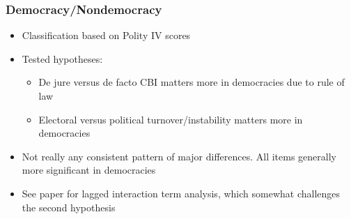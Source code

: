 \documentclass{beamer}
\begin{document}
    \begin{frame}
        \frametitle{Democracy/Nondemocracy}
        \begin{itemize}
            \item Classification based on Polity IV scores
            \item Tested hypotheses:
            \begin{itemize}
                \item De jure versus de facto CBI matters more in democracies due to rule of law
                \item Electoral versus political turnover/instability matters more in democracies
            \end{itemize}
            \item Not really any consistent pattern of major differences. All items generally more significant in democracies
            \item See paper for lagged interaction term analysis, which somewhat challenges the second hypothesis
        \end{itemize}
    \end{frame}
\end{document}
